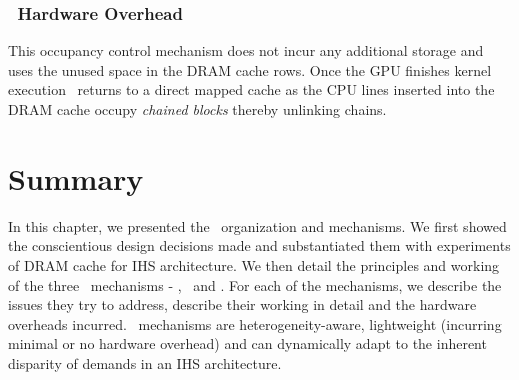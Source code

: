 \subsubsection{\chaining\ Hardware Overhead}
This occupancy control mechanism does not incur any additional storage and uses the unused space in the DRAM cache rows. Once the GPU finishes kernel execution \cachename\ returns to a direct mapped cache as the CPU lines inserted into the DRAM cache occupy \textit{chained blocks} thereby unlinking chains. 

\section{Summary}
In this chapter, we presented the \cachename\ organization and mechanisms. We first showed the conscientious design decisions made and substantiated them with experiments of DRAM cache for IHS architecture. We then detail the principles and working of the three \cachename\ mechanisms - \prioname, \bypassname\ and \chaining. For each of the mechanisms, we describe the issues they try to address, describe their working in detail and the hardware overheads incurred. \cachename\ mechanisms are heterogeneity-aware, lightweight (incurring minimal or no hardware overhead) and can dynamically adapt to the inherent disparity of demands in an IHS architecture.

